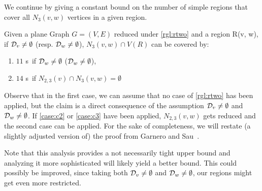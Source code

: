We continue by giving a constant bound on the number of simple regions that cover all  $N_3(v,w)$ vertices in a given region.

\begin{lemma}\label{lemma:rtwosr}
    Given a plane Graph $G = (V,E)$ reduced under \cref{rgl:rtwo}  and a region R(v, w), if $\mathcal{D}_{v} \neq \emptyset $ (resp. $\mathcal{D}_{w} \neq \emptyset$), $N_3(v,w) \cap V(R)$ can be covered by: 
    \begin{enumerate}
        \item $11$ \sr s~if $\mathcal{D}_{w} \neq \emptyset$ ($\mathcal{D}_{w} \neq \emptyset$),
        \item $14$ \sr s~if $N_{2,3}(v) \cap N_3(v,w) = \emptyset$
    \end{enumerate}
\end{lemma}

Observe that in the first case, we can assume that no case of \cref{rgl:rtwo} has been applied, but the claim is a direct consequence of the assumption $\mathcal{D}_{v} \neq \emptyset$ and $\mathcal{D}_{w} \neq \emptyset$. If \cref{case:c2} or \cref{case:c3} have been applied, $N_{2,3}(v,w)$ gets reduced and the second case can be applied. For the sake of completeness, we will restate (a slightly adjusted version of) the proof from Garnero and Sau~\cite[Fact 6, arXiv v2]{Garnero2018}. 

Note that this analysis provides a not necessarily tight upper bound and analyzing it more sophisticated will likely yield a better bound.
This could possibly be improved, since taking both $\mathcal{D}_{v} \neq \emptyset$ and $\mathcal{D}_{w} \neq \emptyset$, our regions might get even more restricted.

